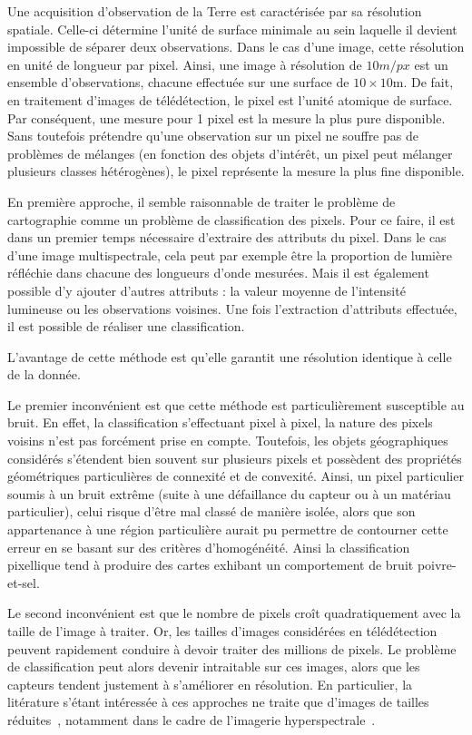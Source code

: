 Une acquisition d'observation de la Terre est caractérisée par sa résolution spatiale. Celle-ci détermine l'unité de surface minimale au sein laquelle il devient impossible de séparer deux observations. Dans le cas d'une image, cette résolution en unité de longueur par pixel. Ainsi, une image à résolution de $10m/px$ est un ensemble d'observations, chacune effectuée sur une surface de $10\times10$m. De fait, en traitement d'images de télédétection, le pixel est l'unité atomique de surface. Par conséquent, une mesure pour 1 pixel est la mesure la plus pure disponible. Sans toutefois prétendre qu'une observation sur un pixel ne souffre pas de problèmes de mélanges (en fonction des objets d'intérêt, un pixel peut mélanger plusieurs classes hétérogènes), le pixel représente la mesure la plus fine disponible.

En première approche, il semble raisonnable de traiter le problème de cartographie comme un problème de classification des pixels. Pour ce faire, il est dans un premier temps nécessaire d'extraire des attributs du pixel. Dans le cas d'une image multispectrale, cela peut par exemple être la proportion de lumière réfléchie dans chacune des longueurs d'onde mesurées. Mais il est également possible d'y ajouter d'autres attributs : la valeur moyenne de l'intensité lumineuse ou les observations voisines. Une fois l'extraction d'attributs effectuée, il est possible de réaliser une classification.

L'avantage de cette méthode est qu'elle garantit une résolution identique à celle de la donnée.

Le premier inconvénient est que cette méthode est particulièrement susceptible au bruit. En effet, la classification s'effectuant pixel à pixel, la nature des pixels voisins n'est pas forcément prise en compte. Toutefois, les objets géographiques considérés s'étendent bien souvent sur plusieurs pixels et possèdent des propriétés géométriques particulières de connexité et de convexité. Ainsi, un pixel particulier soumis à un bruit extrême (suite à une défaillance du capteur ou à un matériau particulier), celui risque d'être mal classé de manière isolée, alors que son appartenance à une région particulière aurait pu permettre de contourner cette erreur en se basant sur des critères d'homogénéité. Ainsi la classification pixellique tend à produire des cartes exhibant un comportement de bruit poivre-et-sel.

Le second inconvénient est que le nombre de pixels croît quadratiquement avec la taille de l'image à traiter. Or, les tailles d'images considérées en télédétection peuvent rapidement conduire à devoir traiter des millions de pixels. Le problème de classification peut alors devenir intraitable sur ces images, alors que les capteurs tendent justement à s'améliorer en résolution. En particulier, la litérature s'étant intéressée à ces approches ne traite que d'images de tailles réduites~\cite{nogueira_learning_2016}, notamment dans le cadre de l'imagerie hyperspectrale~\cite{fauvel_advances_2013}.

